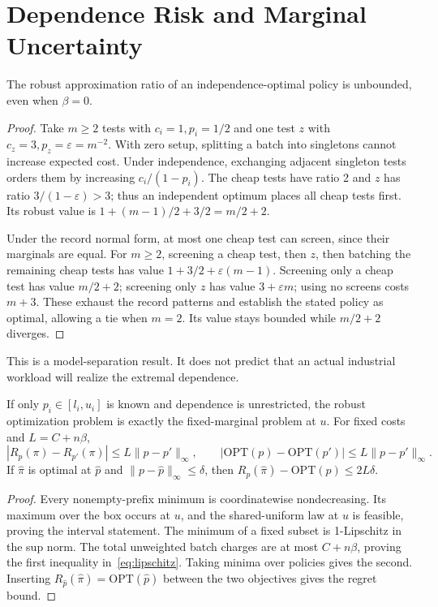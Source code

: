 \documentclass[runningheads]{llncs}
\newcommand{\OPT}{\mathrm{OPT}}
\begin{document}
\section{Dependence Risk and Marginal Uncertainty}
\begin{theorem}\label{thm:gap}
The robust approximation ratio of an independence-optimal policy is
unbounded, even when $\beta=0$.
\end{theorem}
\begin{proof}
Take $m\geq2$ tests with $c_i=1,p_i=1/2$ and one test $z$ with
$c_z=3,p_z=\varepsilon=m^{-2}$. With zero setup, splitting a batch into
singletons cannot increase expected cost. Under independence, exchanging
adjacent singleton tests orders them by increasing $c_i/(1-p_i)$.
The cheap tests have ratio 2 and $z$ has ratio $3/(1-\varepsilon)>3$;
thus an independent optimum places all cheap tests first. Its robust value
is $1+(m-1)/2+3/2=m/2+2$.

Under the record normal form, at most one cheap test can screen, since their
marginals are equal. For $m\geq2$, screening a cheap test, then $z$, then
batching the remaining cheap tests has value
$1+3/2+\varepsilon(m-1)$.
Screening only a cheap test has value $m/2+2$; screening only $z$ has value
$3+\varepsilon m$; using no screens costs $m+3$. These exhaust the
record patterns and establish the stated policy as optimal, allowing a
tie when $m=2$. Its value stays bounded while $m/2+2$ diverges.
\end{proof}
This is a model-separation result. It does not predict that an actual
industrial workload will realize the extremal dependence.

\begin{proposition}\label{prop:uncertainty}
If only $p_i\in[l_i,u_i]$ is known and dependence is unrestricted, the robust
optimization problem is exactly the fixed-marginal problem at $u$.
For fixed costs and $L=C+n\beta$,
\begin{equation}
|R_p(\pi)-R_{p'}(\pi)|\leq L\|p-p'\|_\infty,
\qquad
|\OPT(p)-\OPT(p')|\leq L\|p-p'\|_\infty.
\label{eq:lipschitz}
\end{equation}
If $\widehat{\pi}$ is optimal at $\widehat p$ and
$\|p-\widehat p\|_\infty\leq\delta$, then
$R_p(\widehat{\pi})-\OPT(p)\leq2L\delta$.
\end{proposition}
\begin{proof}
Every nonempty-prefix minimum is coordinatewise nondecreasing. Its maximum
over the box occurs at $u$, and the shared-uniform law at $u$ is feasible,
proving the interval statement. The minimum of a fixed subset is
1-Lipschitz in the sup norm. The total unweighted batch charges are at most
$C+n\beta$, proving the first inequality in~\eqref{eq:lipschitz}.
Taking minima over policies gives the second. Inserting
$R_{\widehat p}(\widehat{\pi})=\OPT(\widehat p)$ between the two objectives
gives the regret bound.
\end{proof}
\end{document}
